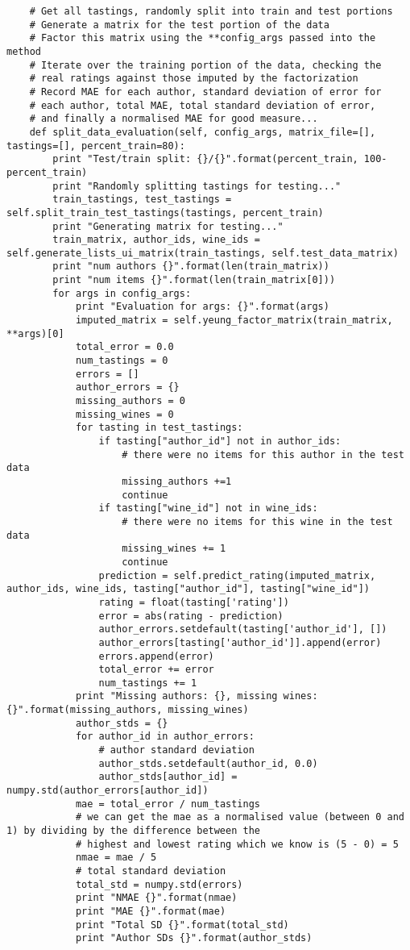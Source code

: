 \begin{verbatim}
    # Get all tastings, randomly split into train and test portions
    # Generate a matrix for the test portion of the data
    # Factor this matrix using the **config_args passed into the method
    # Iterate over the training portion of the data, checking the
    # real ratings against those imputed by the factorization
    # Record MAE for each author, standard deviation of error for 
    # each author, total MAE, total standard deviation of error, 
    # and finally a normalised MAE for good measure...
    def split_data_evaluation(self, config_args, matrix_file=[], tastings=[], percent_train=80):
        print "Test/train split: {}/{}".format(percent_train, 100-percent_train)
        print "Randomly splitting tastings for testing..."
        train_tastings, test_tastings = self.split_train_test_tastings(tastings, percent_train)
        print "Generating matrix for testing..."
        train_matrix, author_ids, wine_ids = self.generate_lists_ui_matrix(train_tastings, self.test_data_matrix)
        print "num authors {}".format(len(train_matrix))
        print "num items {}".format(len(train_matrix[0]))
        for args in config_args:
            print "Evaluation for args: {}".format(args)
            imputed_matrix = self.yeung_factor_matrix(train_matrix, **args)[0]
            total_error = 0.0
            num_tastings = 0
            errors = []
            author_errors = {}
            missing_authors = 0
            missing_wines = 0
            for tasting in test_tastings:
                if tasting["author_id"] not in author_ids:
                    # there were no items for this author in the test data
                    missing_authors +=1
                    continue
                if tasting["wine_id"] not in wine_ids:
                    # there were no items for this wine in the test data
                    missing_wines += 1
                    continue
                prediction = self.predict_rating(imputed_matrix, author_ids, wine_ids, tasting["author_id"], tasting["wine_id"])
                rating = float(tasting['rating'])
                error = abs(rating - prediction)
                author_errors.setdefault(tasting['author_id'], [])
                author_errors[tasting['author_id']].append(error)
                errors.append(error)
                total_error += error
                num_tastings += 1
            print "Missing authors: {}, missing wines: {}".format(missing_authors, missing_wines)
            author_stds = {}
            for author_id in author_errors:
                # author standard deviation
                author_stds.setdefault(author_id, 0.0)
                author_stds[author_id] = numpy.std(author_errors[author_id])
            mae = total_error / num_tastings
            # we can get the mae as a normalised value (between 0 and 1) by dividing by the difference between the
            # highest and lowest rating which we know is (5 - 0) = 5
            nmae = mae / 5
            # total standard deviation
            total_std = numpy.std(errors)
            print "NMAE {}".format(nmae)
            print "MAE {}".format(mae)
            print "Total SD {}".format(total_std)
            print "Author SDs {}".format(author_stds)


\end{verbatim}
